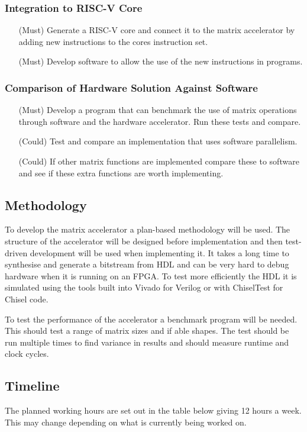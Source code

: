 \subsubsection{Integration to RISC-V Core}
\begin{enumerate}
	\item [(Must)] Generate a RISC-V core and connect it to the matrix accelerator by adding new instructions to the cores instruction set.
	\item [(Must)] Develop software to allow the use of the new instructions in programs.
\end{enumerate}
\subsubsection{Comparison of Hardware Solution Against Software}
\begin{enumerate}
	\item [(Must)] Develop a program that can benchmark the use of matrix operations through software and the hardware accelerator. Run these tests and compare.
	\item [(Could)] Test and compare an implementation that uses software parallelism.
	\item [(Could)] If other matrix functions are implemented compare these to software and see if these extra functions are worth implementing.
\end{enumerate}
			
\subsection{Methodology}
To develop the matrix accelerator a plan-based methodology will be used. The structure of the accelerator will be designed before implementation and then test-driven development will be used when implementing it. It takes a long time to synthesise and generate a bitstream from HDL and can be very hard to debug hardware when it is running on an FPGA. To test more efficiently the HDL it is simulated using the tools built into Vivado for Verilog or with ChiselTest for Chisel code.

To test the performance of the accelerator a benchmark program will be needed. This should test a range of matrix sizes and if able shapes. The test should be run multiple times to find variance in results and should measure runtime and clock cycles.

\subsection{Timeline}
The planned working hours are set out in the table below giving 12 hours a week. This may change depending on what is currently being worked on.

